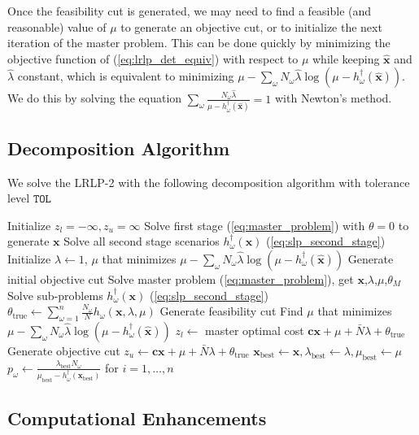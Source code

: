 \documentclass{iserc}
\newcommand{\x}{\mathbf{x}}
\newcommand{\xh}{\hat{\x}}
\newcommand{\lh}{\hat{\lambda}}
\renewcommand{\c}{\mathbf{c}}
\begin{document}
Once the feasibility cut is generated, we may need to find a feasible (and reasonable) value of $\mu$ to generate an objective cut, or to initialize the next iteration of the master problem.
This can be done quickly by minimizing the objective function of (\ref{eq:lrlp_det_equiv}) with respect to $\mu$ while keeping $\xh$ and $\lh$ constant, which is equivalent to minimizing $\mu - \sum_\omega N_\omega \lh \log(\mu - h^\dagger_\omega(\xh))$.
We do this by solving the equation $\sum_\omega \frac{N_\omega \lh}{\mu - h^\dagger_\omega(\xh)} = 1$ with Newton's method.

\subsection{Decomposition Algorithm}

We solve the LRLP-2 with the following decomposition algorithm with tolerance level $\texttt{TOL}$

\begin{algorithmic}
	\State Initialize $z_l = -\infty, z_u = \infty$
	\State Solve first stage (\ref{eq:master_problem}) with $\theta = 0$  to generate $\x$
	\State Solve all second stage scenarios $h^\dagger_\omega(\x)$ (\ref{eq:slp_second_stage})
	\State Initialize $\lambda \gets 1$, $\mu$ that minimizes $\mu - \sum_\omega N_\omega \lh \log(\mu - h^\dagger_\omega(\xh))$
	\State Generate initial objective cut
		\State Solve master problem (\ref{eq:master_problem}), get $\x$,$\lambda$,$\mu$,$\theta_M$
		\State Solve sub-problems $h^\dagger_\omega(\x)$ (\ref{eq:slp_second_stage})
		\State $\theta_{\text{true}} \gets \sum_{\omega=1}^n \frac{N_\omega}{N} h_\omega(\x,\lambda,\mu)$
		\If{$\mu < \max_\omega h^\dagger_\omega(\x)$}
			\State Generate feasibility cut
			\State Find $\mu$ that minimizes $\mu - \sum_\omega N_\omega \lh \log(\mu - h^\dagger_\omega(\xh))$
		\Else
			\State $z_l \gets$ master optimal cost $\c\x + \mu + \bar{N}\lambda + \theta_{\text{true}}$
		\EndIf
		\State Generate objective cut
		\If{$\c\x + \mu + \bar{N}\lambda + \theta_{\text{true}} < z_u$}
			\State $z_u \gets \c\x + \mu + \bar{N}\lambda + \theta_{\text{true}}$
			\State $\x_\text{best} \gets \x, \lambda_\text{best} \gets \lambda, \mu_\text{best} \gets \mu$
			\State $p_\omega \gets \frac{\lambda_\text{best} N_\omega}{\mu_\text{best} - h^\dagger_\omega(\x_\text{best})}$ for $i = 1, \dots, n$
		\EndIf
	\EndWhile
\end{algorithmic}

\subsection{Computational Enhancements}
\end{document}
